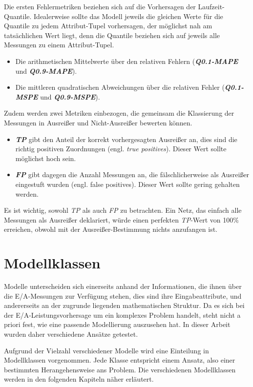 \documentclass[
	twoside,
	12pt,
	a4paper,
	BCOR10mm,
	DIV14,
	listof=totoc,
	bibliography=totoc,
	headsepline
]{scrreprt}
\begin{document}
Die ersten Fehlermetriken beziehen sich auf die Vorhersagen der Laufzeit-Quantile. Idealerweise sollte das Modell jeweils die gleichen Werte für die Quantile zu jedem Attribut-Tupel vorhersagen, der möglichst nah am tatsächlichen Wert liegt, denn die Quantile beziehen sich auf jeweils alle Messungen zu einem Attribut-Tupel.
\begin{itemize}
	\item Die arithmetischen Mittelwerte über den relativen Fehlern (\textit{\textbf{Q0.1-MAPE}} und \textit{\textbf{Q0.9-MAPE}}).
	\item Die mittleren quadratischen Abweichungen über die relativen Fehler (\textit{\textbf{Q0.1-MSPE}} und \textit{\textbf{Q0.9-MSPE}}).
\end{itemize}
Zudem werden zwei Metriken einbezogen, die gemeinsam die Klassierung der Messungen in Ausreißer und Nicht-Ausreißer bewerten können.
\begin{itemize}
	\item \textit{\textbf{TP}} gibt den Anteil der korrekt vorhergesagten Ausreißer an, dies sind die richtig positiven Zuordnungen (engl. \textit{true positives}). Dieser Wert sollte möglichst hoch sein.
	\item \textit{\textbf{FP}} gibt dagegen die Anzahl Messungen an, die fälschlicherweise als Ausreißer eingestuft wurden (engl. false positives). Dieser Wert sollte gering gehalten werden.
\end{itemize}
Es ist wichtig, sowohl \textit{TP} als auch \textit{FP} zu betrachten. Ein Netz, das einfach alle Messungen als Ausreißer deklariert, würde einen perfekten \textit{TP}-Wert von 100\% erreichen, obwohl mit der Ausreißer-Bestimmung nichts anzufangen ist.

\section{Modellklassen}
\label{analyse:modellklassen}
Modelle unterscheiden sich einerseits anhand der Informationen, die ihnen über die E/A-Messungen zur Verfügung stehen, dies sind ihre Eingabeattribute, und andererseits an der zugrunde liegenden mathematischen Struktur.
Da es sich bei der E/A-Leistungsvorhersage um ein komplexes Problem handelt, steht nicht a priori fest, wie eine passende Modellierung auszusehen hat. 
In dieser Arbeit wurden daher verschiedene Ansätze getestet.

Aufgrund der Vielzahl verschiedener Modelle wird eine Einteilung in Modellklassen vorgenommen. Jede Klasse entspricht einem Ansatz, also einer bestimmten Herangehensweise ans Problem.
Die verschiedenen Modellklassen werden in den folgenden Kapiteln näher erläutert.
\end{document}

